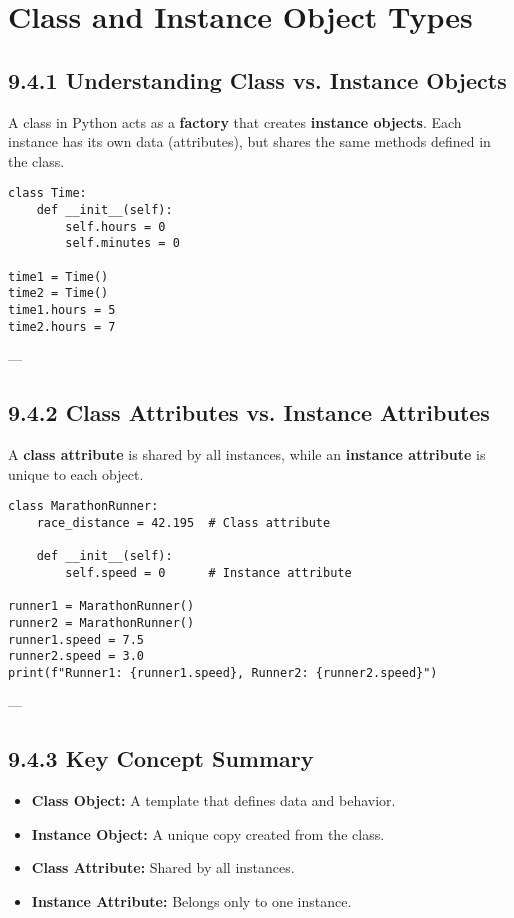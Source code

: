 \chapter{Class and Instance Object Types}

\section{9.4.1 Understanding Class vs. Instance Objects}

A class in Python acts as a \textbf{factory} that creates \textbf{instance objects}. 
Each instance has its own data (attributes), but shares the same methods defined in the class.

\begin{verbatim}
class Time:
    def __init__(self):
        self.hours = 0
        self.minutes = 0

time1 = Time()
time2 = Time()
time1.hours = 5
time2.hours = 7
\end{verbatim}

---

\section{9.4.2 Class Attributes vs. Instance Attributes}

A \textbf{class attribute} is shared by all instances, while an \textbf{instance attribute} is unique to each object.

\begin{verbatim}
class MarathonRunner:
    race_distance = 42.195  # Class attribute

    def __init__(self):
        self.speed = 0      # Instance attribute

runner1 = MarathonRunner()
runner2 = MarathonRunner()
runner1.speed = 7.5
runner2.speed = 3.0
print(f"Runner1: {runner1.speed}, Runner2: {runner2.speed}")
\end{verbatim}


---

\section{9.4.3 Key Concept Summary}

\begin{itemize}
    \item \textbf{Class Object:} A template that defines data and behavior.
    \item \textbf{Instance Object:} A unique copy created from the class.
    \item \textbf{Class Attribute:} Shared by all instances.
    \item \textbf{Instance Attribute:} Belongs only to one instance.
\end{itemize}

